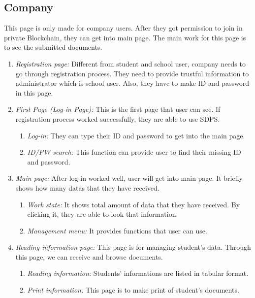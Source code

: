 \documentclass[conference]{IEEEtran}
\begin{document}
\subsection{Company}
This page is only made for company users. After they got permission to join in private Blockchain, they can get into main page. The main work for this page is to see the submitted documents.
\begin{enumerate}
	\item \textit {Registration page:} Different from student and school user, company needs to go through registration process. They need to provide trustful information to administrator which is school user. Also, they have to make ID and password in this page.\\
    
    \item \textit {First Page (Log-in Page):} This is the first page that user can see. If registration process worked successfully, they are able to use SDPS. \\
    \begin{enumerate}
    	\item \textit {Log-in:} They can type their ID and password to get into the main page.\\
        \item \textit {ID/PW search:} This function can provide user to find their missing ID and password.\\
    \end{enumerate}
    
    \item \textit {Main page:} After log-in worked well, user will get into main page. It briefly shows how many datas that they have received. \\
    \begin{enumerate}
    	\item \textit {Work state:} It shows total amount of data that they have received. By clicking it, they are able to look that information.\\
        \item \textit {Management menu:} It provides functions that user can use.\\
    \end{enumerate}
    
       \item \textit {Reading information page:} This page is for managing student’s data. Through this page, we can receive and browse documents. \\
    \begin{enumerate}
    	\item  \textit {Reading information:} Students’ informations are listed in tabular format. \\
        \item \textit {Print information:} This page is to make print of student’s documents.\\
    \end{enumerate}
        
\end{enumerate}
\end{document}
